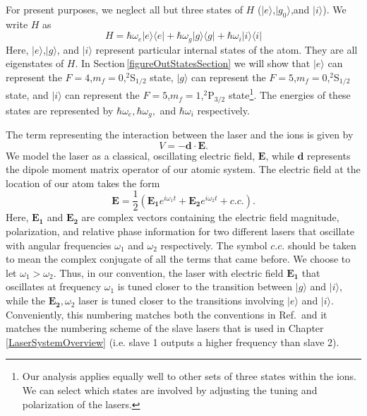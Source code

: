 For present purposes, we neglect all but three states of $H$ ($|e\rangle$,$|g_0\rangle$,and $|i\rangle$). We write $H$ as 
\begin{equation}
H=
\hbar\omega_e |e\rangle\langle e | +
\hbar\omega_g |g\rangle\langle g | +
\hbar\omega_i |i\rangle\langle i | 
\end{equation}
Here, $|e\rangle$,$|g\rangle$, and $|i\rangle$ represent particular internal states of the atom. They are all eigenstates of $H$. In Section\,\ref{figureOutStatesSection} we will show that $|e\rangle$ can represent the $F=4$,$m_f=0$,$^2$S$_{1/2}$ state, $|g\rangle$ can represent the $F=5$,$m_f=0$,$^2$S$_{1/2}$ state, and $|i\rangle$ can represent the $F=5$,$m_f=1$,$^2$P$_{3/2}$ state\footnote{Our analysis applies equally well to other sets of three states within the ions. We can select which states are involved by adjusting the tuning and polarization of the lasers.}. The energies of these states are represented by $\hbar\omega_e,\hbar\omega_g,$ and $\hbar\omega_i$ respectively. 

The term representing the interaction between the laser and the ions is given by
\begin{equation}
V=-\mathbf{d}\cdot\mathbf{E}.
\end{equation}
We model the laser as a classical, oscillating electric field, $\mathbf{E}$, while $\mathbf{d}$ represents the dipole moment matrix operator of our atomic system. The electric field at the location of our atom takes the form 
\begin{equation}
\mathbf{E}=\frac{1}{2}\left(\mathbf{E_1} e^{i\omega_1 t} + \mathbf{E_2} e^{i\omega_2 t} + c.c. \right). \label{eqn:Efield}
\end{equation}
Here, $\mathbf{E_1}$ and $\mathbf{E_2}$ are complex vectors containing the electric field magnitude, polarization, and relative phase information for two different lasers that oscillate with angular frequencies $\omega_1$ and $\omega_2$ respectively. The symbol $c.c.$ should be taken to mean the complex conjugate of all the terms that came before. We choose to let $\omega_1>\omega_2$. 
Thus, in our convention, the laser with electric field $\mathbf{E_1}$ that oscillates at frequency $\omega_1$ is tuned closer to the transition between $|g\rangle$ and $|i\rangle$, while the $\mathbf{E_2}, \omega_2$ laser is tuned closer to the transitions involving $|e\rangle$ and $|i\rangle$. Conveniently, this numbering matches both the conventions in Ref.\,\cite{Young1997363} and it matches the numbering scheme of the slave lasers that is used in Chapter\,\ref{LaserSystemOverview} (i.e. slave 1 outputs a higher frequency than slave 2). 

